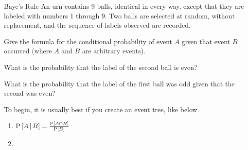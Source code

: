 		\begin{example}{Baye's Rule}
			An urn contains 9 balls, identical in every way, except that they are labeled with numbers 1 through 9.
			Two balls are selected at random, without replacement, and the sequence of labels observed are recorded.
			\begin{boldalphlist}
				\item Give the formula for the conditional probability of event $A$ given that event $B$ occurred (where $A$ and $B$ are arbitrary events).
				\item What is the probability that the label of the second ball is even?
				\item What is the probability that the label of the first ball was odd given that the second was even?
			\end{boldalphlist}
		
			\tcblower
			To begin, it is usually best if you create an event tree, like below.
			\newline
			\begin{center}
				
			\end{center}
			\begin{enumerate}[label=(\alph*)]
				\item $\operatorname{\operatorname{P}} \left[ A \operatorname{\vert} B \right] = \frac{\operatorname{\operatorname{P}} \left[ A \cap B \right]}{\operatorname{\operatorname{P}} \left[ B \right]}$
				\item 
			\end{enumerate}
		\end{example}
	
